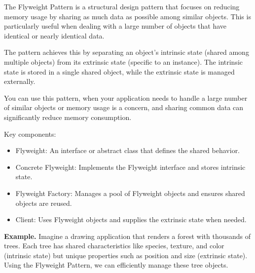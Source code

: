 The Flyweight Pattern is a structural design pattern that focuses on reducing memory usage by sharing as much data as possible among similar objects.
This is particularly useful when dealing with a large number of objects that have identical or nearly identical data.

The pattern achieves this by separating an object’s intrinsic state (shared among multiple objects) from its extrinsic state
(specific to an instance). The intrinsic state is stored in a single shared object, while the extrinsic state is managed externally.

You can use this pattern, when your application needs to handle a large number of similar objects or memory usage is a concern,
and sharing common data can significantly reduce memory consumption.

Key components:
\begin{itemize}
\item Flyweight: An interface or abstract class that defines the shared behavior.

\item Concrete Flyweight: Implements the Flyweight interface and stores intrinsic state.

\item Flyweight Factory: Manages a pool of Flyweight objects and ensures shared objects are reused.

\item Client: Uses Flyweight objects and supplies the extrinsic state when needed.
\end{itemize}

\textbf{Example.} Imagine a drawing application that renders a forest with thousands of trees.
Each tree has shared characteristics like species, texture, and color (intrinsic state) but unique properties such as
position and size (extrinsic state). Using the Flyweight Pattern, we can efficiently manage these tree objects.


